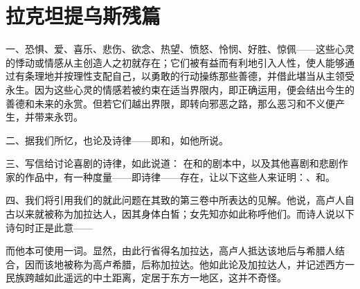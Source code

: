 
\chapter{拉克坦提乌斯残篇}


一、恐惧、爱、喜乐、悲伤、欲念、热望、愤怒、怜悯、好胜、惊佩——这些心灵的悸动或情感从主创造人之初就存在；它们被有益而有利地引入人性，使人能够通过有条理地并按理性支配自己，以勇敢的行动操练那些善德，并借此堪当从主领受永生。因为这些心灵的情感若被约束在适当界限内，即正确运用，便会结出今生的善德和未来的永赏。但若它们越出界限，即转向邪恶之路，那么恶习和不义便产生，并带来永罚。\par

二、据我们所忆，也论及诗律——即和，如他所说。\par

三、写信给讨论喜剧的诗律，如此说道： 在和的剧本中，以及其他喜剧和悲剧作家的作品中，有一种度量——即诗律——存在，让以下这些人来证明：、和。\par

四、我们将引用我们的就此问题在其致的第三卷中所表达的见解。他说，高卢人自古以来就被称为加拉达人，因其身体白皙；女先知亦如此称呼他们。而诗人说以下诗句时正是此意——\par

\par

而他本可使用一词。显然，由此行省得名加拉达，高卢人抵达该地后与希腊人结合，因而该地被称为高卢希腊，后称加拉达。他如此论及加拉达人，并记述西方一民族跨越如此遥远的中土距离，定居于东方一地区，这并不奇怪。\par

